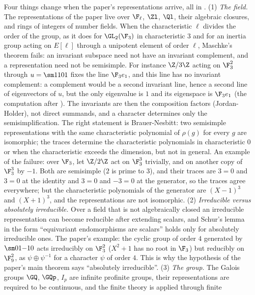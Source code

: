 \begin{remark}\label{rem:prereq:changes}
Four things change when the paper's representations arrive, all in .
(1) \emph{The field.} The representations of the paper live over $\F_\ell$, $\Zl$, $\Ql$, their
algebraic closures, and rings of integers of number fields. When the characteristic $\ell$ divides
the order of the group, as it does for $\GL_2(\F_3)$ in characteristic $3$ and for an inertia group
acting on $E[\ell]$ through a unipotent element of order $\ell$, Maschke's theorem fails: an
invariant subspace need not have an invariant complement, and a representation need not be
semisimple. For instance $\Z/3\Z$ acting on $\F_3^2$ through $u=\sm1101$ fixes the line $\F_3e_1$,
and this line has no invariant complement: a complement would be a second invariant line, hence a
second line of eigenvectors of $u$, but the only eigenvalue is $1$ and its eigenspace is $\F_3e_1$
(the computation after ). The invariants are then the composition factors
(Jordan-Holder), not direct summands, and a character determines only the semisimplification. The
right statement is Brauer-Nesbitt: two semisimple representations with the same characteristic
polynomial of $\rho(g)$ for every $g$ are isomorphic; the traces determine the characteristic
polynomials in characteristic $0$ or when the characteristic exceeds the dimension, but not in
general. An example of the failure: over $\F_3$, let $\Z/2\Z$ act on $\F_3^3$ trivially, and on
another copy of $\F_3^3$ by $-1$. Both are semisimple ($2$ is prime to $3$), and their traces are
$3=0$ and $3=0$ at the identity and $3=0$ and $-3=0$ at the generator, so the traces agree everywhere;
but the characteristic polynomials of the generator are $(X-1)^3$ and $(X+1)^3$, and the
representations are not isomorphic.
(2) \emph{Irreducible versus absolutely irreducible.} Over a field that is not algebraically closed
an irreducible representation can become reducible after extending scalars, and Schur's lemma in
the form ``equivariant endomorphisms are scalars'' holds only for absolutely irreducible ones. The
paper's example: the cyclic group of order $4$ generated by $\sm01{-1}0$ acts irreducibly on
$\F_3^2$ ($X^2+1$ has no root in $\F_3$) but reducibly on $\F_9^2$, as $\psi\oplus\psi^{-1}$ for a
character $\psi$ of order $4$. This is why the hypothesis of the paper's main theorem says
``absolutely irreducible''.
(3) \emph{The group.} The Galois groups $\GQ$, $\GQp$, $I_p$ are infinite profinite groups, their
representations are required to be continuous, and the finite theory is applied through finite

\end{remark}
